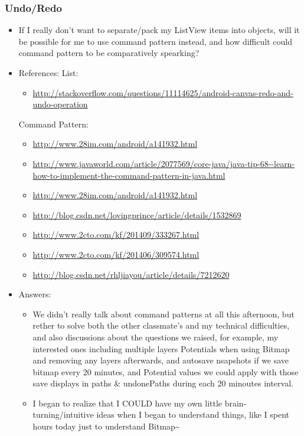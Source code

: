 \documentclass[9pt,b5paper]{article}
\begin{document}
\subsubsection{Undo/Redo}
\label{sec-5-2-3}
\begin{itemize}
\item If I really don't want to separate/pack my ListView items into objects, will it be possible for me to use command pattern instead, and how difficult could command pattern to be comparatively spearking?
\item References:
List: 
\begin{itemize}
\item \url{http://stackoverflow.com/questions/11114625/android-canvas-redo-and-undo-operation}
\end{itemize}
Command Pattern:
\begin{itemize}
\item \url{http://www.28im.com/android/a141932.html}
\item \url{http://www.javaworld.com/article/2077569/core-java/java-tip-68--learn-how-to-implement-the-command-pattern-in-java.html}
\item \url{http://www.28im.com/android/a141932.html}
\item \url{http://blog.csdn.net/lovingprince/article/details/1532869}
\item \url{http://www.2cto.com/kf/201409/333267.html}
\item \url{http://www.2cto.com/kf/201406/309574.html}
\item \url{http://blog.csdn.net/rhljiayou/article/details/7212620}
\end{itemize}
\item Answers: 
\begin{itemize}
\item We didn't really talk about command patterns at all this afternoon, but rether to solve both the other classmate's and my technical difficulties, and also discussions about the questions we raised, for example, my interested ones including multiple layers Potentials when using Bitmap and removing any layers afterwards, and autosave nsapshots if we save bitmap every 20 minutes, and Potential values we could apply with those save displays in paths \& undonePaths during each 20 minoutes interval.
\item I began to realize that I COULD have my own little brain-turning/intuitive ideas when I began to understand things, like I spent hours today just to understand Bitmap\textasciitilde{}
\end{itemize}
\end{itemize}
\end{document}
